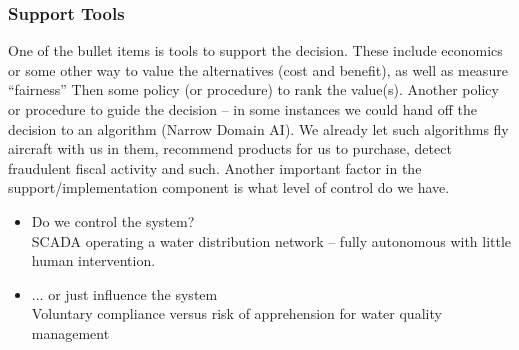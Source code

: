 \subsubsection{Support Tools}
One of the bullet items is tools to support the decision.  
These include economics or some other way to value the alternatives (cost and benefit), as well as measure ``fairness''
Then some policy (or procedure) to rank the value(s).
Another policy or procedure to guide the decision -- in some instances we could hand off the decision to an algorithm (Narrow Domain AI).  We already let such algorithms fly aircraft with us in them, recommend products for us to purchase, detect fraudulent fiscal activity and such.
Another important factor in the support/implementation component is what level of control do we have.
\begin{itemize}
\item Do we control the system? \\
SCADA operating a water distribution network -- fully autonomous with little human intervention.
\item $\dots$ or just influence the system \\
Voluntary compliance versus risk of apprehension for water quality management
\end{itemize}

